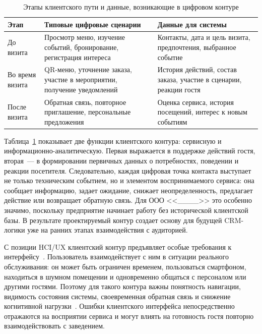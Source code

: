 \begin{table}[H]
\centering
\small
\caption{Этапы клиентского пути и данные, возникающие в цифровом контуре}
\label{tab:customer_journey_data}
\begin{tabularx}{\textwidth}{|p{}|p{}|X|}
\hline
\textbf{Этап} & \textbf{Типовые цифровые сценарии} & \textbf{Данные для системы} \\ \hline
До визита & Просмотр меню, изучение событий, бронирование, регистрация интереса & Контакты, дата и цель визита, предпочтения, выбранное событие \\ \hline
Во время визита & QR-меню, уточнение заказа, участие в мероприятии, получение уведомлений & История действий, состав заказа, участие в сценарии, реакции гостя \\ \hline
После визита & Обратная связь, повторное приглашение, персональные предложения & Оценка сервиса, история посещений, интерес к новым событиям \\ \hline
\end{tabularx}
\normalsize
\end{table}

Таблица~\ref{tab:customer_journey_data} показывает две функции клиентского контура: сервисную и информационно-аналитическую. Первая выражается в поддержке действий гостя, вторая~--- в формировании первичных данных о потребностях, поведении и реакции посетителя. Следовательно, каждая цифровая точка контакта выступает не только техническим событием, но и элементом воспринимаемого сервиса: она сообщает информацию, задает ожидание, снижает неопределенность, предлагает действие или возвращает обратную связь. Для ООО <<\_\_\_\_>> это особенно значимо, поскольку предприятие начинает работу без исторической клиентской базы. В результате проектируемый контур создает основу для будущей CRM-логики уже на ранних этапах взаимодействия с аудиторией.

С позиции HCI/UX клиентский контур предъявляет особые требования к интерфейсу~\cite{norman2013}. Пользователь взаимодействует с ним в ситуации реального обслуживания: он может быть ограничен временем, пользоваться смартфоном, находиться в шумном помещении и одновременно общаться с персоналом или другими гостями. Поэтому для такого контура важны понятность навигации, видимость состояния системы, своевременная обратная связь и снижение когнитивной нагрузки~\cite{norman2013}. Ошибки клиентского интерфейса непосредственно отражаются на восприятии сервиса и могут влиять на готовность гостя повторно взаимодействовать с заведением.

